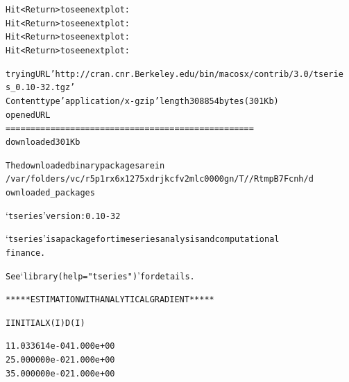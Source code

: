 \documentclass[letterpaper,10pt,english]{/Users/edwsurewin/anaconda/lib/python2.7/site-packages/sphinx/texinputs/sphinxhowto}
\newenvironment{InvisibleVerbatim}
        {\begin{mdframed}[leftmargin=0.1\linewidth,innerleftmargin=3pt,innerrightmargin=3pt, userdefinedwidth=1\linewidth, linewidth=0pt, linecolor=white, usetwoside=false]}
        {\end{mdframed}}
\begin{document}
        

            
                \begin{InvisibleVerbatim}
                \vspace{-0.5\baselineskip}
\begin{alltt}Hit <Return> to see next plot:
Hit <Return> to see next plot:
Hit <Return> to see next plot:
Hit <Return> to see next plot:
\end{alltt}

            \end{InvisibleVerbatim}
            
                \begin{InvisibleVerbatim}
                \vspace{-0.5\baselineskip}
\begin{alltt}trying URL 'http://cran.cnr.Berkeley.edu/bin/macosx/contrib/3.0/tserie
s\_0.10-32.tgz'
Content type 'application/x-gzip' length 308854 bytes (301 Kb)
opened URL
==================================================
downloaded 301 Kb


The downloaded binary packages are in
        /var/folders/vc/r5p1rx6x1275xdrjkcfv2mlc0000gn/T//RtmpB7Fcnh/d
ownloaded\_packages

    ‘tseries’ version: 0.10-32

    ‘tseries’ is a package for time series analysis and computational
    finance.

    See ‘library(help="tseries")’ for details.


 ***** ESTIMATION WITH ANALYTICAL GRADIENT *****


     I     INITIAL X(I)        D(I)

     1     1.033614e-04     1.000e+00
     2     5.000000e-02     1.000e+00
     3     5.000000e-02     1.000e+00


\end{alltt}
\end{InvisibleVerbatim}
\end{document}
